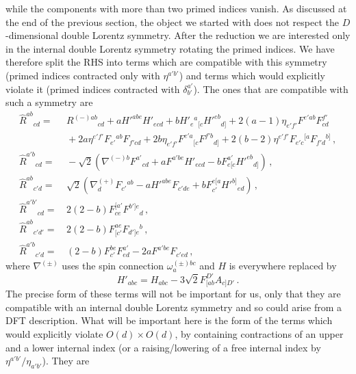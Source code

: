 \documentclass[a4paper,11pt]{article}
\begin{document}
while the components with more than two primed indices vanish. As discussed at the end of the previous section, the object we started with does not respect the $D$-dimensional double Lorentz symmetry. After the reduction we are interested only in the internal double Lorentz symmetry rotating the primed indices. We have therefore split the RHS into terms which are compatible with this symmetry (primed indices contracted only with $\eta^{a'b'}$) and terms which would explicitly violate it (primed indices contracted with $\delta^{a'}_{b'}$). The ones that are compatible with such a symmetry are
\begin{equation}
\begin{aligned}
\hat R^{ab}{}_{cd}
=&\,
R^{(-)ab}{}_{cd}
+aH'^{abe}H'_{ecd}
+bH'_e{}^a{}_{[c}H'^{eb}{}_{d]}
+2(a-1)\eta_{e'f'}F^{e'ab}F^{f'}_{cd}
\\
&\,{}
+2a\eta^{e'f'}F_{e'}{}^{ab}F_{f'cd}
+2b\eta_{e'f'}F^{e'a}{}_{[c}F^{f'b}{}_{d]}
+2(b-2)\eta^{e'f'}F_{e'c}{}^{[a}F_{f'd}{}^{b]}\,,
\\
\hat R^{a'b}{}_{cd}
=&\,
-\sqrt2
\left(
\nabla^{(-)b}F^{a'}{}_{cd}
+aF^{a'be}H'_{ecd}
-bF^{a'}_{e[c}H'^{eb}{}_{d]}
\right)\,,
\\
\hat R^{ab}{}_{c'd}
=&\,
\sqrt2
\left(
\nabla^{(+)}_dF_{c'}{}^{ab}
-aH'^{abe}F_{c'de}
+bF_{c'}^{e[a}H'^{b]}{}_{ed}
\right)\,,
\\
\hat R^{a'b'}{}_{cd}
=&\,
2(2-b)F^{[a'}_{ce}F^{b']e}{}_d\,,
\\
\hat R^{ab}{}_{c'd'}
=&\,
2(2-b)F_{[c'}^{ae}F_{d']e}{}^b\,,
\\
\hat R^{a'b}{}_{c'd}
=&\,
(2-b)F_{c'}^{be}F^{a'}_{ed}
-2aF^{a'be}F_{c'ed}\,,
\end{aligned}
\end{equation}
where $\nabla^{(\pm)}$ uses the spin connection $\omega_a^{(\pm)bc}$ and $H$ is everywhere replaced by 
\begin{equation}
H'_{abc}=H_{abc}-3\sqrt2F_{[ab}^{D'}A_{c]D'}\,.
\end{equation}
The precise form of these terms will not be important for us, only that they are compatible with an internal double Lorentz symmetry and so could arise from a DFT description. What will be important here is the form of the terms which would explicitly violate $O(d)\times O(d)$, by containing contractions of an upper and a lower internal index (or a raising/lowering of a free internal index by $\eta^{a'b'}/\eta_{a'b'}$). They are
\end{document}
